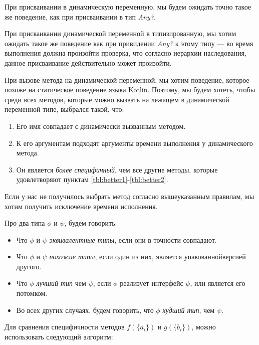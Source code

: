 При присваивании в динамическую переменную, мы будем ожидать точно такое же поведение, как при присваивании в тип \textit{Any?}.

При присваивании динамической переменной в типизированную, мы хотим ожидать такое же поведение как при привидении \textit{Any?} к этому типу --- во время выполнения должна произойти проверка, что согласно иерархии наследования, данное присваивание действительно может произойти.%

При вызове метода на динамической переменной, мы хотим поведение, которое похоже на статическое поведение языка Kotlin.
Поэтому, мы будем хотеть, чтобы среди всех методов, которые можно вызвать на лежащем в динамической переменной типе, выбрался такой, что:
\begin{enumerate}
    \item Его имя совпадает с динамически вызванным методом. \label{tbl:better1}
    \item К его аргументам подходят аргументы времени выполнения у динамического метода. \label{tbl:better2}
    \item Он является \textit{более специфичный}, чем все другие методы, которые удовлетворяют пунктам \ref{tbl:better1}-\ref{tbl:better2}.
\end{enumerate}

Если у нас не получилось выбрать метод согласно вышеуказанным правилам, мы хотим получить исключение времени исполнения.

Про два типа $\phi$ и $\psi$, будем говорить:
\begin{itemize}
    \item Что $\phi$ и $\psi$ \textit{эквивалентные типы}, если они в точности совпадают.
    \item Что $\phi$ и $\psi$ \textit{похожие типы}, если один из них, является упакованной\footnotemark       версией другого.
    \item Что $\phi$ \textit{лучший тип} чем  $\psi$, если $\phi$ реализует интерфейс $\psi$, или является его потомком.
    \item Во всех других случаях, будем говорить, что $\phi$ \textit{худший тип}, чем $\psi$.
\end{itemize}


Для сравнения специфичности методов $f(\{a_i\})$ и $g(\{b_i\})$, можно использовать следующий алгоритм:

